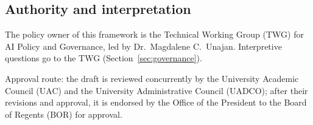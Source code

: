 \subsection{Authority and interpretation}
The policy owner of this framework is the Technical Working Group (TWG) for AI Policy and Governance, led by Dr.\ Magdalene C.\ Unajan. Interpretive questions go to the TWG (Section~\ref{sec:governance}).

Approval route: the draft is reviewed concurrently by the University Academic Council (UAC) and the University Administrative Council (UADCO); after their revisions and approval, it is endorsed by the Office of the President to the Board of Regents (BOR) for approval.
